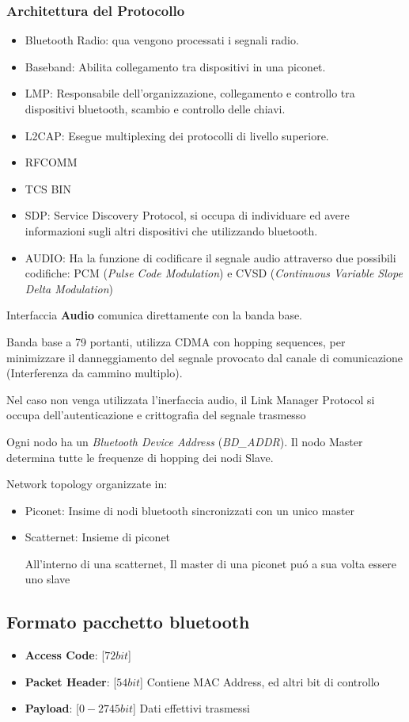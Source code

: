 \documentclass{article}
\begin{document}
\subsubsection{Architettura del Protocollo}
\begin{itemize}
    \item Bluetooth Radio: qua vengono processati i segnali radio.
    \item Baseband: Abilita collegamento tra dispositivi in una piconet.
    \item LMP: Responsabile dell'organizzazione, collegamento e controllo tra dispositivi bluetooth, scambio e controllo delle chiavi.
    \item L2CAP: Esegue multiplexing dei protocolli di livello superiore.
    \item RFCOMM
    \item TCS BIN
    \item SDP: Service Discovery Protocol, si occupa di individuare ed avere informazioni sugli altri dispositivi che utilizzando bluetooth.
    \item AUDIO: Ha la funzione di codificare il segnale audio attraverso due possibili codifiche: PCM (\textit{Pulse Code Modulation}) e CVSD (\textit{Continuous Variable Slope Delta Modulation})
\end{itemize}
Interfaccia \textbf{Audio} comunica direttamente con la banda base.

Banda base a 79 portanti, utilizza CDMA con hopping sequences, per minimizzare il danneggiamento del segnale provocato dal canale di comunicazione (Interferenza da cammino multiplo).

Nel caso non venga utilizzata l'inerfaccia audio, il Link Manager Protocol si occupa dell'autenticazione e crittografia del segnale trasmesso


Ogni nodo ha un \textit{Bluetooth Device Address} (\textit{BD\_ADDR}). Il nodo Master determina tutte le frequenze di hopping dei nodi Slave.

Network topology organizzate in:
\begin{itemize}
    \item Piconet: Insime di nodi bluetooth sincronizzati con un unico master
    \item Scatternet: Insieme di piconet

        All'interno di una scatternet, Il master di una piconet pu\'o a sua volta essere uno slave
\end{itemize}


\subsection{Formato pacchetto bluetooth}
\begin{itemize}
    \item \textbf{Access Code}: [$72 bit$]
    \item \textbf{Packet Header}: [$54 bit$] Contiene MAC Address, ed altri bit di controllo
    \item \textbf{Payload}: [$0-2745 bit$] Dati effettivi trasmessi
\end{itemize}
\end{document}
